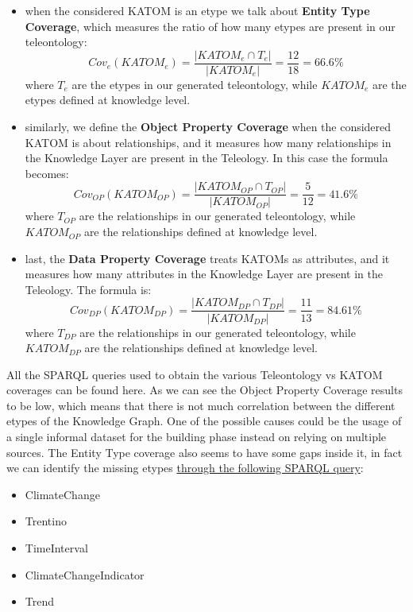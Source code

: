 \begin{itemize}
	\item when the considered KATOM is an etype we talk about
	\textbf{Entity Type Coverage}, which measures the ratio
	of how many etypes are present in our teleontology: 
		$$Cov_e(KATOM_e) = \frac{|KATOM_e \cap T_e|}{|KATOM_e|} = \frac{12}{18} = 66.6\%$$
	where $T_e$ are the etypes in our generated teleontology, while $KATOM_e$
	are the etypes defined at knowledge level.

	\item similarly, we define the \textbf{Object Property Coverage} 
	when the considered KATOM is about relationships, and it measures
	how many relationships in the Knowledge Layer are present in the
	Teleology. In this case the formula becomes:
		$$Cov_{OP}(KATOM_{OP}) = \frac{|KATOM_{OP} \cap T_{OP}|}{|KATOM_{OP}|} = \frac{5}{12} = 41.6\%$$
	where $T_{OP}$ are the relationships in our generated teleontology, while $KATOM_{OP}$
	are the relationships defined at knowledge level.

	\item last, the \textbf{Data Property Coverage} treats 
	KATOMs as attributes, and it measures
	how many attributes in the Knowledge Layer are present in the
	Teleology. The formula is:
		$$Cov_{DP}(KATOM_{DP}) = \frac{|KATOM_{DP} \cap T_{DP}|}{|KATOM_{DP}|} = \frac{11}{13} = 84.61\%$$
	where $T_{DP}$ are the relationships in our generated teleontology, while $KATOM_{DP}$
	are the relationships defined at knowledge level.
\end{itemize}

All the SPARQL queries used to obtain the various
Teleontology vs KATOM coverages can be found here.
As we can see the Object Property Coverage results to be low, which means that there is not much
correlation between the different etypes of the Knowledge Graph. One of the possible causes
could be the usage of a single informal dataset for the building phase instead on relying on
multiple sources. The Entity Type coverage also seems to have some gaps inside it, in fact
we can identify the missing etypes \href{https://github.com/zerise000/KG_Project2025_ClimateChange/blob/main/Evaluation/knowledgeEvaluation/missingEtypes.txt}{through the following SPARQL query}:

\begin{itemize}
	\item ClimateChange
	\item Trentino
	\item TimeInterval
	\item ClimateChangeIndicator
	\item Trend
\end{itemize}

